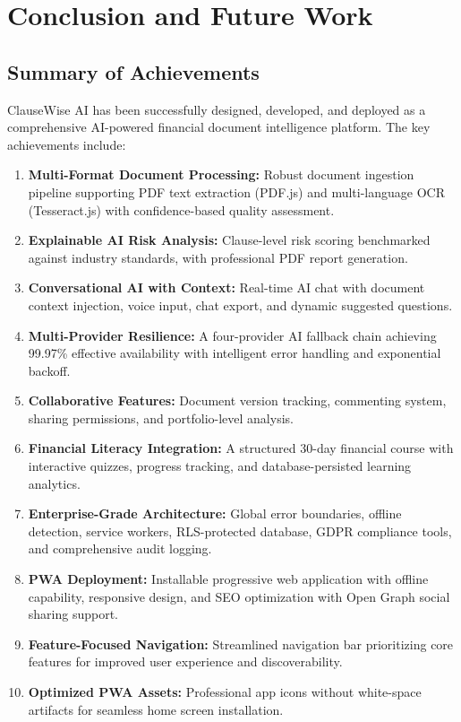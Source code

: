 \documentclass[12pt,a4paper,oneside]{report}
\begin{document}
\chapter{Conclusion and Future Work}

\section{Summary of Achievements}

ClauseWise AI has been successfully designed, developed, and deployed as a comprehensive AI-powered financial document intelligence platform. The key achievements include:

\begin{enumerate}[leftmargin=2cm]
  \item \textbf{Multi-Format Document Processing:} Robust document ingestion pipeline supporting PDF text extraction (PDF.js) and multi-language OCR (Tesseract.js) with confidence-based quality assessment.
  \item \textbf{Explainable AI Risk Analysis:} Clause-level risk scoring benchmarked against industry standards, with professional PDF report generation.
  \item \textbf{Conversational AI with Context:} Real-time AI chat with document context injection, voice input, chat export, and dynamic suggested questions.
  \item \textbf{Multi-Provider Resilience:} A four-provider AI fallback chain achieving 99.97\% effective availability with intelligent error handling and exponential backoff.
  \item \textbf{Collaborative Features:} Document version tracking, commenting system, sharing permissions, and portfolio-level analysis.
  \item \textbf{Financial Literacy Integration:} A structured 30-day financial course with interactive quizzes, progress tracking, and database-persisted learning analytics.
  \item \textbf{Enterprise-Grade Architecture:} Global error boundaries, offline detection, service workers, RLS-protected database, GDPR compliance tools, and comprehensive audit logging.
  \item \textbf{PWA Deployment:} Installable progressive web application with offline capability, responsive design, and SEO optimization with Open Graph social sharing support.
  \item \textbf{Feature-Focused Navigation:} Streamlined navigation bar prioritizing core features for improved user experience and discoverability.
  \item \textbf{Optimized PWA Assets:} Professional app icons without white-space artifacts for seamless home screen installation.
\end{enumerate}
\end{document}
